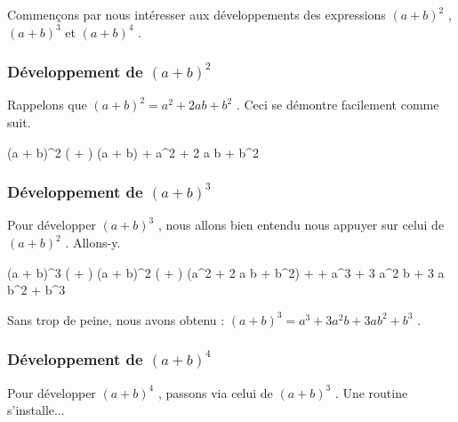 Commençons par nous intéresser aux développements des expressions
$(a + b)^2$ ,
$(a + b)^3$ et
$(a + b)^4$ .




\subsubsection{Développement de $(a + b)^2$}

Rappelons que  $(a + b)^2 = a^2 + 2 a b + b^2$ .
Ceci se démontre facilement comme suit.

\medskip

\begin{stepcalc}[style = sar]
	(a + b)^2
		\explnext{}
	( + ) (a + b)
		\explnext{}
	 + 
		\explnext{}
	a^2 + 2 a b + b^2
\end{stepcalc}




\subsubsection{Développement de $(a + b)^3$}

Pour développer $(a + b)^3$ , nous allons bien entendu nous appuyer sur celui de $(a + b)^2$ . Allons-y.

\medskip

\begin{stepcalc}[style = sar]
	(a + b)^3
		\explnext{}
	( + ) (a + b)^2
		\explnext{}
	( + ) (a^2 + 2 a b + b^2)
		\explnext{}
	+
		\explnext{}
	+
		\explnext{}
	a^3 + 3 a^2 b + 3 a b^2 + b^3
\end{stepcalc}

\medskip

Sans trop de peine, nous avons obtenu :
$(a + b)^3 = a^3 + 3 a^2 b + 3 a b^2 + b^3$ .




\subsubsection{Développement de $(a + b)^4$}

Pour développer $(a + b)^4$ , passons via celui de $(a + b)^3$ . Une routine s'installe...

